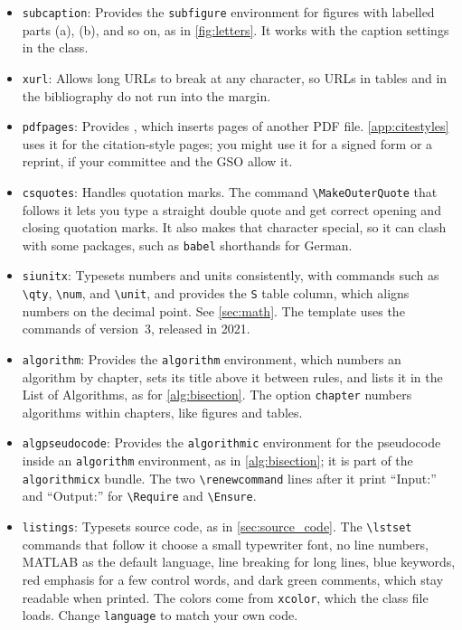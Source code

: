 \begin{itemize}
\item \texttt{subcaption}: Provides the \texttt{subfigure} environment for figures with labelled parts (a), (b), and so on, as in \cref{fig:letters}. It works with the caption settings in the class.

\item \texttt{xurl}: Allows long URLs to break at any character, so URLs in tables and in the bibliography do not run into the margin.

\item \texttt{pdfpages}: Provides \verb++, which inserts pages of another PDF file. \cref{app:citestyles} uses it for the citation-style pages; you might use it for a signed form or a reprint, if your committee and the GSO allow it.

\item \texttt{csquotes}: Handles quotation marks. The command \verb+\MakeOuterQuote+ that follows it lets you type a straight double quote and get correct opening and closing quotation marks. It also makes that character special, so it can clash with some packages, such as \texttt{babel} shorthands for German.

\item \texttt{siunitx}: Typesets numbers and units consistently, with commands such as \verb+\qty+, \verb+\num+, and \verb+\unit+, and provides the \texttt{S} table column, which aligns numbers on the decimal point. See \cref{sec:math}. The template uses the commands of version~3, released in 2021.

\item \texttt{algorithm}: Provides the \texttt{algorithm} environment, which numbers an algorithm by chapter, sets its title above it between rules, and lists it in the List of Algorithms, as for \cref{alg:bisection}. The option \texttt{chapter} numbers algorithms within chapters, like figures and tables.

\item \texttt{algpseudocode}: Provides the \texttt{algorithmic} environment for the pseudocode inside an \texttt{algorithm} environment, as in \cref{alg:bisection}; it is part of the \texttt{algorithmicx} bundle. The two \verb+\renewcommand+ lines after it print ``Input:'' and ``Output:'' for \verb+\Require+ and \verb+\Ensure+.

\item \texttt{listings}: Typesets source code, as in \cref{sec:source_code}. The \verb+\lstset+ commands that follow it choose a small typewriter font, no line numbers, MATLAB as the default language, line breaking for long lines, blue keywords, red emphasis for a few control words, and dark green comments, which stay readable when printed. The colors come from \texttt{xcolor}, which the class file loads. Change \texttt{language} to match your own code.


\end{itemize}
